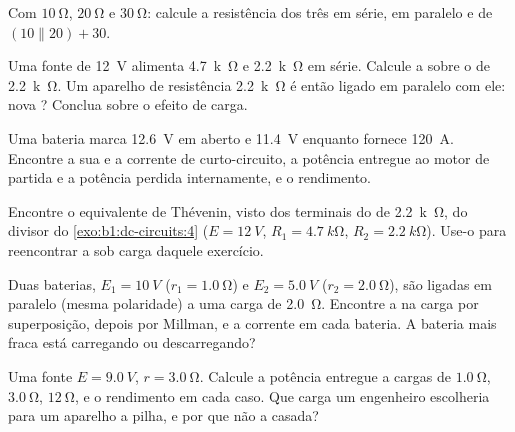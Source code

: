 \begin{exercise}[$\star$]\label{exo:b1:dc-circuits:3}
Com $\qty{10}{\ohm}$, $\qty{20}{\ohm}$ e $\qty{30}{\ohm}$: calcule
a resistência dos três em série, em paralelo e de
$(10 \parallel 20) + 30$.
\end{exercise}

\begin{exercise}[$\star$]\label{exo:b1:dc-circuits:4}
Uma fonte de \qty{12}{V} alimenta \qty{4.7}{k\ohm} e \qty{2.2}{k\ohm} em
série. Calcule a  sobre o  de \qty{2.2}{k\ohm}. Um aparelho de
resistência \qty{2.2}{k\ohm} é então ligado em paralelo com ele: nova ?
Conclua sobre o efeito de carga.
\end{exercise}

\begin{exercise}[$\star\star$]\label{exo:b1:dc-circuits:5}
Uma bateria marca \qty{12.6}{V} em aberto e \qty{11.4}{V} enquanto fornece
\qty{120}{A}. Encontre a sua  e a corrente de curto-circuito,
a potência entregue ao motor de partida e a potência perdida internamente, e o
rendimento.
\end{exercise}

\begin{exercise}[$\star\star$]\label{exo:b1:dc-circuits:6}
Encontre o equivalente de Thévenin, visto dos terminais do  de
\qty{2.2}{k\ohm}, do divisor do \cref{exo:b1:dc-circuits:4}
($E = \qty{12}{V}$, $R_1 = \qty{4.7}{k\ohm}$, $R_2 = \qty{2.2}{k\ohm}$).
Use-o para reencontrar a  sob carga daquele exercício.
\end{exercise}

\begin{exercise}[$\star\star$]\label{exo:b1:dc-circuits:7}
Duas baterias, $E_1 = \qty{10}{V}$ ($r_1 = \qty{1.0}{\ohm}$) e
$E_2 = \qty{5.0}{V}$ ($r_2 = \qty{2.0}{\ohm}$), são ligadas em
paralelo (mesma polaridade) a uma carga de \qty{2.0}{\ohm}. Encontre a 
na carga por superposição, depois por Millman, e a corrente em cada
bateria. A bateria mais fraca está carregando ou descarregando?
\end{exercise}

\begin{exercise}[$\star\star$]\label{exo:b1:dc-circuits:8}
Uma fonte $E = \qty{9.0}{V}$, $r = \qty{3.0}{\ohm}$. Calcule a potência
entregue a cargas de $\qty{1.0}{\ohm}$, $\qty{3.0}{\ohm}$, $\qty{12}{\ohm}$,
e o rendimento em cada caso. Que carga um engenheiro escolheria para
um aparelho a pilha, e por que não a casada?
\end{exercise}

